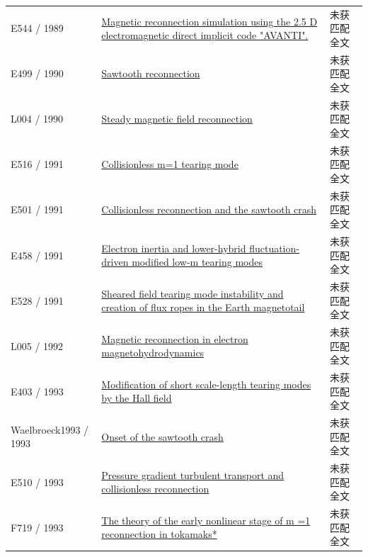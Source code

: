 \documentclass[UTF8,a4paper,11pt,openany,fontset=fandol]{ctexbook}
\begin{document}
\begin{longtable}{P{24mm}P{97mm}P{27mm}}
E544 / 1989 & \href{https://ui.adsabs.harvard.edu/abs/1989ESASP.285...55H/abstract}{Magnetic reconnection simulation using the 2.5 D electromagnetic direct implicit code "AVANTI".} & 未获匹配全文\\

E499 / 1990 & \href{https://doi.org/10.1088/0029-5515/30/12/008}{Sawtooth reconnection} & 未获匹配全文\\

L004 / 1990 & \href{https://doi.org/10.1029/gm058p0063}{Steady magnetic field reconnection} & 未获匹配全文\\

E516 / 1991 & \href{https://doi.org/10.1103/physrevlett.66.425}{Collisionless m=1 tearing mode} & 未获匹配全文\\

E501 / 1991 & \href{https://doi.org/10.1103/physrevlett.66.1458}{Collisionless reconnection and the sawtooth crash} & 未获匹配全文\\

E458 / 1991 & \href{https://doi.org/10.1063/1.859804}{Electron inertia and lower-hybrid fluctuation-driven modified low-m tearing modes} & 未获匹配全文\\

E528 / 1991 & \href{https://doi.org/10.1029/91gl00235}{Sheared field tearing mode instability and creation of flux ropes in the Earth magnetotail} & 未获匹配全文\\

L005 / 1992 & \href{https://doi.org/10.1063/1.860467}{Magnetic reconnection in electron magnetohydrodynamics} & 未获匹配全文\\

E403 / 1993 & \href{https://doi.org/10.1063/1.860880}{Modification of short scale-length tearing modes by the Hall field} & 未获匹配全文\\

Waelbroeck1993 / 1993 & \href{https://doi.org/10.1103/physrevlett.70.3259}{Onset of the sawtooth crash} & 未获匹配全文\\

E510 / 1993 & \href{https://doi.org/10.1088/0741-3335/35/6/009}{Pressure gradient turbulent transport and collisionless reconnection} & 未获匹配全文\\

F719 / 1993 & \href{https://doi.org/10.1063/1.860735}{The theory of the early nonlinear stage of m =1 reconnection in tokamaks*} & 未获匹配全文\\


\end{longtable}
\end{document}
